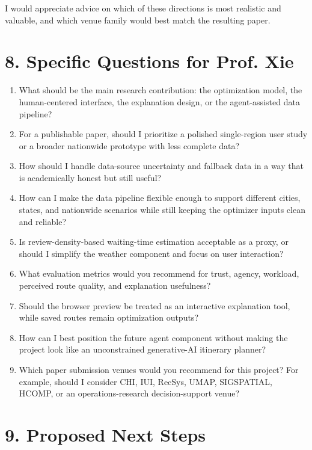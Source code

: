 \documentclass[11pt,a4paper]{article}
\begin{document}
\noindent I would appreciate advice on which of these directions is most realistic and valuable, and which venue family would best match the resulting paper.

\section*{8. Specific Questions for Prof. Xie}

\begin{enumerate}
    \item What should be the main research contribution: the optimization model, the human-centered interface, the explanation design, or the agent-assisted data pipeline?
    \item For a publishable paper, should I prioritize a polished single-region user study or a broader nationwide prototype with less complete data?
    \item How should I handle data-source uncertainty and fallback data in a way that is academically honest but still useful?
    \item How can I make the data pipeline flexible enough to support different cities, states, and nationwide scenarios while still keeping the optimizer inputs clean and reliable?
    \item Is review-density-based waiting-time estimation acceptable as a proxy, or should I simplify the weather component and focus on user interaction?
    \item What evaluation metrics would you recommend for trust, agency, workload, perceived route quality, and explanation usefulness?
    \item Should the browser preview be treated as an interactive explanation tool, while saved routes remain optimization outputs?
    \item How can I best position the future agent component without making the project look like an unconstrained generative-AI itinerary planner?
    \item Which paper submission venues would you recommend for this project? For example, should I consider CHI, IUI, RecSys, UMAP, SIGSPATIAL, HCOMP, or an operations-research decision-support venue?
\end{enumerate}

\section*{9. Proposed Next Steps}
\end{document}
